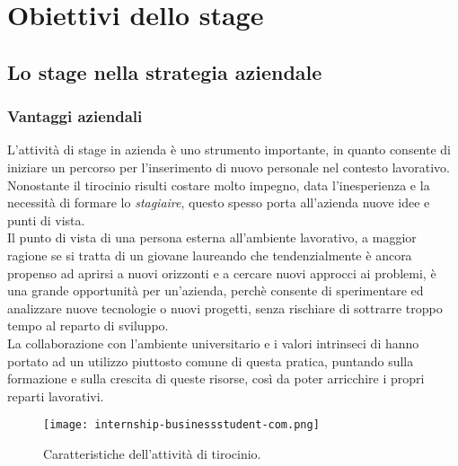 \newpage
\chapter{Obiettivi dello stage}
\label{cap:obiettivi-stage}
\section{Lo stage nella strategia aziendale}
\subsection{Vantaggi aziendali}
L'attività di stage in azienda è uno strumento importante, in quanto consente di iniziare un percorso per l'inserimento di nuovo personale nel contesto lavorativo.\\
Nonostante il tirocinio risulti costare molto impegno, data l'inesperienza e la necessità di formare lo \textit{stagiaire}, questo spesso porta all'azienda nuove idee e punti di vista.\\
Il punto di vista di una persona esterna all'ambiente lavorativo, a maggior ragione se si tratta di un giovane laureando che tendenzialmente è ancora propenso ad aprirsi a nuovi orizzonti e a cercare nuovi approcci ai problemi, è una grande opportunità per un'azienda, perchè consente di sperimentare ed analizzare nuove tecnologie o nuovi progetti, senza rischiare di sottrarre troppo tempo al reparto di sviluppo.\\
La collaborazione con l'ambiente universitario e i valori intrinseci di \AD{} hanno portato ad un utilizzo piuttosto comune di questa pratica, puntando sulla formazione e sulla crescita di queste risorse, così da poter arricchire i propri reparti lavorativi.

\begin{figure}[h]
\texttt{[image: internship-businessstudent-com.png]}
\centering
\caption{Caratteristiche dell'attività di tirocinio.} 
\label{fig:internship}
\end{figure}


